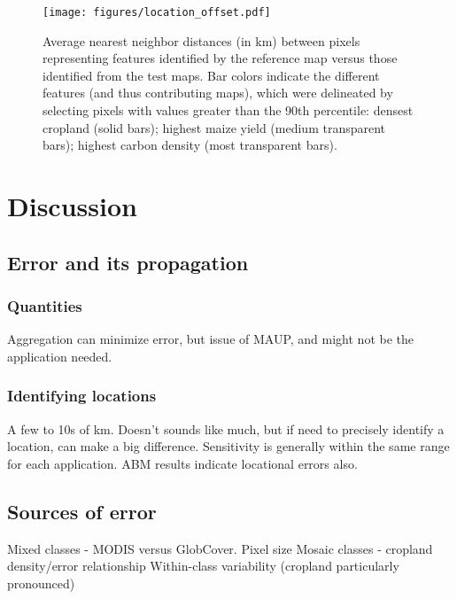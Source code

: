 \documentclass[a4paper]{article}
\begin{document}

\begin{figure}[!ht]
\centerline{\texttt{[image: figures/location\_offset.pdf]}}
\caption{Average nearest neighbor distances (in km) between pixels representing features identified by the reference map versus those identified from the test maps. Bar colors indicate the different features (and thus contributing maps), which were delineated by selecting pixels with values greater than the 90th percentile: densest cropland (solid bars); highest maize yield (medium transparent bars); highest carbon density (most transparent bars).}   
\label{afoto}
\end{figure}


\vspace{-0.5 cm}
\section*{Discussion}
\vspace{-0.2 cm}

\subsection*{Error and its propagation}
\subsubsection*{Quantities}
Aggregation can minimize error, but issue of MAUP, and might not be the application needed. 

\subsubsection*{Identifying locations}
A few to 10s of km. Doesn't sounds like much, but if need to precisely identify a location, can make a big difference. 
Sensitivity is generally within the same range for each application. 
ABM results indicate locational errors also. 

\subsection*{Sources of error}
Mixed classes - MODIS versus GlobCover. 
Pixel size
Mosaic classes - cropland density/error relationship
Within-class variability (cropland particularly pronounced)
\end{document}
